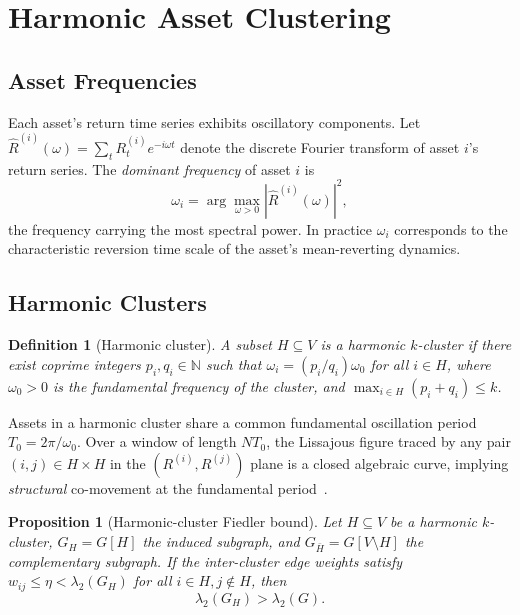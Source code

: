 \documentclass[twocolumn,11pt,a4paper]{article}
\newtheorem{proposition}[theorem]{Proposition}
\newtheorem{definition}[theorem]{Definition}
\theoremstyle{remark}
\newcommand{\N}{\mathbb{N}}
\newcommand{\lam}[1]{\lambda_{#1}}
\begin{document}
\section{Harmonic Asset Clustering}
\label{sec:harmonic}

\subsection{Asset Frequencies}

Each asset's return time series exhibits oscillatory components.
Let $\hat{R}^{(i)}(\omega) = \sum_t R_t^{(i)} e^{-i\omega t}$ denote the discrete Fourier
transform of asset $i$'s return series. The \emph{dominant frequency}
of asset $i$ is
\begin{equation}
  \omega_i = \arg\max_{\omega>0} |\hat{R}^{(i)}(\omega)|^2,
\end{equation}
the frequency carrying the most spectral power. In practice $\omega_i$ corresponds
to the characteristic reversion time scale of the asset's mean-reverting dynamics.

\subsection{Harmonic Clusters}

\begin{definition}[Harmonic cluster]
\label{def:harmcluster}
A subset $H\subseteq V$ is a \emph{harmonic $k$-cluster} if there exist
coprime integers $p_i, q_i \in \N$ such that $\omega_i = (p_i/q_i)\omega_0$ for all
$i\in H$, where $\omega_0 > 0$ is the \emph{fundamental frequency} of the cluster,
and $\max_{i\in H}(p_i+q_i) \leq k$.
\end{definition}

Assets in a harmonic cluster share a common fundamental oscillation period
$T_0 = 2\pi/\omega_0$. Over a window of length $N T_0$, the Lissajous figure
traced by any pair $(i,j)\in H\times H$ in the $(R^{(i)},R^{(j)})$ plane
is a closed algebraic curve, implying \emph{structural} co-movement
at the fundamental period~\cite{whittaker1927}.

\begin{proposition}[Harmonic-cluster Fiedler bound]
\label{prop:harmonic}
Let $H\subseteq V$ be a harmonic $k$-cluster, $G_H = G[H]$ the induced subgraph,
and $G_{\bar H} = G[V\setminus H]$ the complementary subgraph.
If the inter-cluster edge weights satisfy
$w_{ij} \leq \eta < \lam{2}(G_H)$ for all $i\in H, j\notin H$, then
\begin{equation}
  \lam{2}(G_H) > \lam{2}(G).
\end{equation}
\end{proposition}
\end{document}

